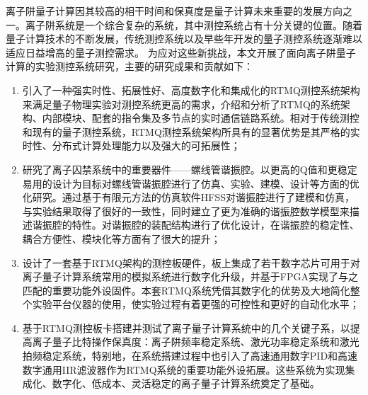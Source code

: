 
\begin{conclusion}

离子阱量子计算因其较高的相干时间和保真度是量子计算未来重要的发展方向之一。离子阱系统是一个综合复杂的系统，其中测控系统占有十分关键的位置。随着量子计算技术的不断发展，传统测控系统以及早些年开发的量子测控系统逐渐难以适应日益增高的量子测控需求。
为应对这些新挑战，本文开展了面向离子阱量子计算的实验测控系统研究，主要的研究成果和贡献如下：
\begin{enumerate}
    \item 引入了一种强实时性、拓展性好、高度数字化和集成化的RTMQ测控系统架构来满足量子物理实验对测控系统更高的需求，介绍和分析了RTMQ的系统架构、内部模块、配套的指令集及多节点的实时通信链路系统。相对于传统测控和现有的量子测控系统，RTMQ测控系统架构所具有的显著优势是其严格的实时性、分布式计算处理能力以及强大的可拓展性；
    \item 研究了离子囚禁系统中的重要器件——螺线管谐振腔。以更高的Q值和更稳定易用的设计为目标对螺线管谐振腔进行了仿真、实验、建模、设计等方面的优化研究。通过基于有限元方法的仿真软件HFSS对谐振腔进行了建模和仿真，与实验结果取得了很好的一致性，同时建立了更为准确的谐振腔数学模型来描述谐振腔的特性。对谐振腔的装配结构进行了优化设计，在谐振腔的稳定性、耦合方便性、模块化等方面有了很大的提升；
    \item 设计了一套基于RTMQ架构的测控板硬件，板上集成了若干数字芯片可用于对离子量子计算系统常用的模拟系统进行数字化升级，并基于FPGA实现了与之匹配的重要功能外设固件。本套RTMQ系统凭借其数字化的优势及大地简化整个实验平台仪器的使用，使实验过程有着更强的可控性和更好的自动化水平；
    \item 基于RTMQ测控板卡搭建并测试了离子量子计算系统中的几个关键子系，以提高离子量子比特操作保真度：离子阱频率稳定系统、激光功率稳定系统和激光拍频稳定系统，特别地，在系统搭建过程中也引入了高速通用数字PID和高速数字通用IIR滤波器作为RTMQ系统的重要功能外设拓展。这些系统为实现集成化、数字化、低成本、灵活稳定的离子量子计算系统奠定了基础。
\end{enumerate}



\end{conclusion}
